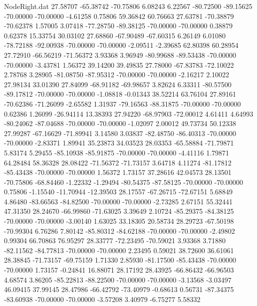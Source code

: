 \begin{filecontents}{NodeRight.dat}
  27.58707  -65.38742  -70.75806     6.08243    6.22567  -80.72500  -89.15625  -70.00000  -70.00000   -4.61258    0.75806   59.36842   60.76663
  27.63781  -70.38879  -70.62378     1.57005    3.07418  -77.28750  -89.38125  -70.00000  -70.00000    0.38879    0.62378   15.33754   30.03102
  27.68860  -67.90489  -67.60315     6.26149    6.01080  -78.72188  -92.00938  -70.00000  -70.00000   -2.09511   -2.39685   62.80398   60.28954
  27.72910  -66.56219  -71.56372     3.93368    3.96949  -80.99688  -89.53438  -70.00000  -70.00000   -3.43781    1.56372   39.14200   39.49835
  27.78000  -67.83783  -72.10022     2.78768    3.28905  -81.08750  -87.95312  -70.00000  -70.00000   -2.16217    2.10022   27.98134   33.01390
  27.84099  -68.91182  -69.98657     3.82624    6.33311  -80.57500  -89.17812  -70.00000  -70.00000   -1.08818   -0.01343   38.52214   63.76104
  27.89161  -70.62386  -71.26099    -2.65582    1.31937  -79.16563  -88.31875  -70.00000  -70.00000    0.62386    1.26099  -26.94114   13.38393
  27.94220  -68.97903  -72.00012     4.61411    4.64993  -80.24062  -87.04688  -70.00000  -70.00000   -1.02097    2.00012   49.73734   50.12338
  27.99287  -67.16629  -71.89941     3.14580    3.03837  -82.48750  -86.40313  -70.00000  -70.00000   -2.83371    1.89941   35.23873   34.03523
  28.03353  -65.58884  -71.79871     5.83174    5.29455  -85.10938  -85.91875  -70.00000  -70.00000   -4.41116    1.79871   64.28484   58.36328
  28.08422  -71.56372  -71.73157     3.64718    4.11274  -81.17812  -85.43438  -70.00000  -70.00000    1.56372    1.73157   37.28616   42.04573
  28.13501  -70.75806  -68.84460    -1.22332   -1.29494  -80.54375  -87.58125  -70.00000  -70.00000    0.75806   -1.15540  -11.70944  -12.39503
  28.17557  -67.26715  -72.67151     5.68849    4.86480  -83.66563  -84.82500  -70.00000  -70.00000   -2.73285    2.67151   55.32441   47.31350
  28.24670  -66.99860  -71.63025     3.39649    2.10724  -85.29375  -84.38125  -70.00000  -70.00000   -3.00140    1.63025   33.18305   20.58734
  28.29723  -67.50198  -70.99304     6.76286    7.80142  -85.80312  -84.62188  -70.00000  -70.00000   -2.49802    0.99304   66.70863   76.95297
  28.33777  -72.23495  -70.59021     3.93368    3.71880  -82.11562  -84.77813  -70.00000  -70.00000    2.23495    0.59021   38.72600   36.61061
  28.38845  -71.73157  -69.75159     1.71330    2.85930  -81.17500  -85.43438  -70.00000  -70.00000    1.73157   -0.24841   16.88071   28.17192
  28.43925  -66.86432  -66.96503     4.68574    3.86205  -85.22813  -88.22500  -70.00000  -70.00000   -3.13568   -3.03497   46.09415   37.99145
  28.47986  -66.42792  -73.40979    -0.68613    0.56731  -87.34375  -83.60938  -70.00000  -70.00000   -3.57208    3.40979   -6.75277    5.58332

\end{filecontents}
